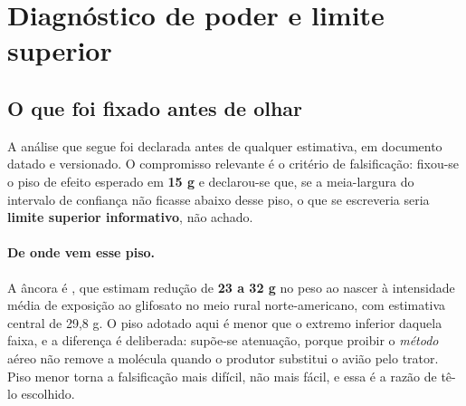%
%
%

\section{Diagnóstico de poder e limite superior}
\label{sec:diagnostico}

\subsection{O que foi fixado antes de olhar}
\label{sub:prespec-fechada}

A análise que segue foi declarada antes de qualquer estimativa, em documento
datado e versionado. O compromisso relevante é o critério de falsificação:
fixou-se o piso de efeito esperado em \textbf{15 g} e declarou-se que, se a
meia-largura do intervalo de confiança não ficasse abaixo desse piso, o que se
escreveria seria \textbf{limite superior informativo}, não achado.

\paragraph{De onde vem esse piso.}
A âncora é \citet{reynier2025glyphosate}, que estimam redução de \textbf{23 a
32 g} no peso ao nascer à intensidade média de exposição ao glifosato no meio
rural norte-americano, com estimativa central de 29,8 g. O piso adotado aqui é
menor que o extremo inferior daquela faixa, e a diferença é deliberada: supõe-se
atenuação, porque proibir o \emph{método} aéreo não remove a molécula quando o
produtor substitui o avião pelo trator. Piso menor torna a falsificação mais
difícil, não mais fácil, e essa é a razão de tê-lo escolhido.

